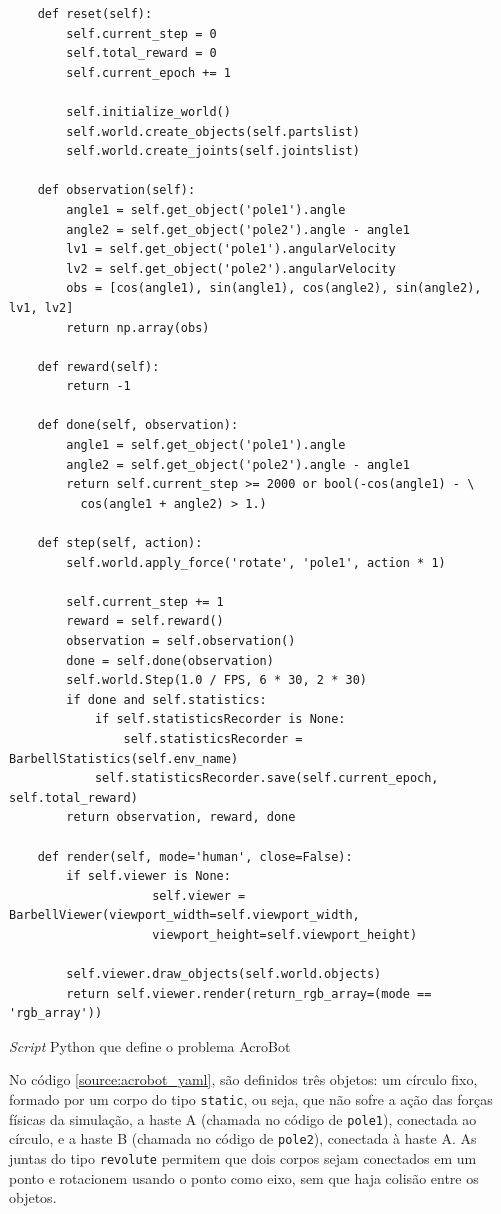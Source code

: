 \documentclass[cic,tc]{iiufrgs}
\newenvironment{longlisting}{\captionsetup{type=listing}}{}
\begin{document}
\begin{longlisting}
\begin{verbatim}
    def reset(self):
        self.current_step = 0
        self.total_reward = 0
        self.current_epoch += 1

        self.initialize_world()
        self.world.create_objects(self.partslist)
        self.world.create_joints(self.jointslist)

    def observation(self):
        angle1 = self.get_object('pole1').angle
        angle2 = self.get_object('pole2').angle - angle1
        lv1 = self.get_object('pole1').angularVelocity
        lv2 = self.get_object('pole2').angularVelocity
        obs = [cos(angle1), sin(angle1), cos(angle2), sin(angle2), lv1, lv2]
        return np.array(obs)

    def reward(self):
        return -1

    def done(self, observation):
        angle1 = self.get_object('pole1').angle
        angle2 = self.get_object('pole2').angle - angle1
        return self.current_step >= 2000 or bool(-cos(angle1) - \
          cos(angle1 + angle2) > 1.)

    def step(self, action):
        self.world.apply_force('rotate', 'pole1', action * 1)

        self.current_step += 1
        reward = self.reward()
        observation = self.observation()
        done = self.done(observation)
        self.world.Step(1.0 / FPS, 6 * 30, 2 * 30)
        if done and self.statistics:
            if self.statisticsRecorder is None:
                self.statisticsRecorder = BarbellStatistics(self.env_name)
            self.statisticsRecorder.save(self.current_epoch, self.total_reward)
        return observation, reward, done

    def render(self, mode='human', close=False):
        if self.viewer is None:
                    self.viewer = BarbellViewer(viewport_width=self.viewport_width,
                    viewport_height=self.viewport_height)

        self.viewer.draw_objects(self.world.objects)
        return self.viewer.render(return_rgb_array=(mode == 'rgb_array'))

\end{verbatim}
\caption[Cópia de DNA]{\textit{Script} Python que define o problema AcroBot}
\label{source:acrobot_python}
\end{longlisting}


No código \ref{source:acrobot_yaml}, são definidos três objetos: um círculo fixo, formado por um corpo
do tipo \texttt{static}, ou seja, que não sofre a ação das forças físicas da simulação,
a haste A (chamada no código de \texttt{pole1}), conectada ao círculo, e a haste B
(chamada no código de \texttt{pole2}), conectada à haste A. As juntas do tipo
\texttt{revolute} permitem que dois corpos sejam conectados em um ponto e rotacionem
usando o ponto como eixo, sem que haja colisão entre os objetos.
\end{document}
